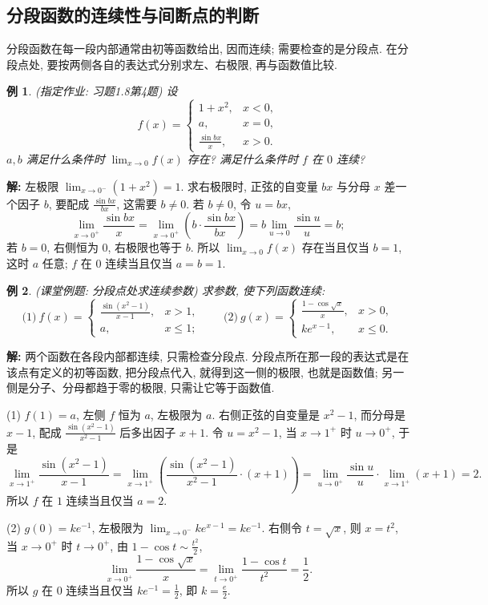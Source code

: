 \documentclass[UTF8,openany]{ctexbook}
\theoremstyle{chinesetextbook}
\newtheorem{example}{例}[section]
\newenvironment{cnsolution}{\par\indent\textbf{解:} \ignorespaces}{\par}
\begin{document}
\subsection{分段函数的连续性与间断点的判断}
分段函数在每一段内部通常由初等函数给出, 因而连续; 需要检查的是分段点. 在分段点处, 要按两侧各自的表达式分别求左、右极限, 再与函数值比较.
\begin{example}
\textnormal{(指定作业: 习题1.8第4题)} 设
\[
f(x)=\begin{cases}1+x^2,&x<0,\\a,&x=0,\\\frac{\sin bx}x,&x>0.\end{cases}
\]
$a,b$ 满足什么条件时 $\displaystyle\lim_{x\to0}f(x)$ 存在? 满足什么条件时 $f$ 在 $0$ 连续?
\end{example}
\begin{cnsolution}
左极限 $\displaystyle\lim_{x\to0^-}(1+x^2)=1$. 求右极限时, 正弦的自变量 $bx$ 与分母 $x$ 差一个因子 $b$, 要配成 $\displaystyle\frac{\sin bx}{bx}$, 这需要 $b\ne0$. 若 $b\ne0$, 令 $u=bx$,
\[
\lim_{x\to0^+}\frac{\sin bx}x=\lim_{x\to0^+}\left(b\cdot\frac{\sin bx}{bx}\right)=b\lim_{u\to0}\frac{\sin u}u=b;
\]
若 $b=0$, 右侧恒为 $0$, 右极限也等于 $b$. 所以 $\displaystyle\lim_{x\to0}f(x)$ 存在当且仅当 $b=1$, 这时 $a$ 任意; $f$ 在 $0$ 连续当且仅当 $a=b=1$.
\end{cnsolution}
\begin{example}
\textnormal{(课堂例题: 分段点处求连续参数)} 求参数, 使下列函数连续:
\[
\text{(1)}\ f(x)=\begin{cases}\frac{\sin(x^2-1)}{x-1},&x>1,\\a,&x\le1;\end{cases}\qquad\text{(2)}\ g(x)=\begin{cases}\frac{1-\cos\sqrt x}x,&x>0,\\ke^{x-1},&x\le0.\end{cases}
\]
\end{example}
\begin{cnsolution}
两个函数在各段内部都连续, 只需检查分段点. 分段点所在那一段的表达式是在该点有定义的初等函数, 把分段点代入, 就得到这一侧的极限, 也就是函数值; 另一侧是分子、分母都趋于零的极限, 只需让它等于函数值.

(1) $f(1)=a$, 左侧 $f$ 恒为 $a$, 左极限为 $a$. 右侧正弦的自变量是 $x^2-1$, 而分母是 $x-1$, 配成 $\displaystyle\frac{\sin(x^2-1)}{x^2-1}$ 后多出因子 $x+1$. 令 $u=x^2-1$, 当 $x\to1^+$ 时 $u\to0^+$, 于是
\[
\lim_{x\to1^+}\frac{\sin(x^2-1)}{x-1}=\lim_{x\to1^+}\left(\frac{\sin(x^2-1)}{x^2-1}\cdot(x+1)\right)=\lim_{u\to0^+}\frac{\sin u}u\cdot\lim_{x\to1^+}(x+1)=2.
\]
所以 $f$ 在 $1$ 连续当且仅当 $a=2$.

(2) $g(0)=ke^{-1}$, 左极限为 $\displaystyle\lim_{x\to0^-}ke^{x-1}=ke^{-1}$. 右侧令 $t=\sqrt x$, 则 $x=t^2$, 当 $x\to0^+$ 时 $t\to0^+$, 由 $\displaystyle1-\cos t\sim\frac{t^2}2$,
\[
\lim_{x\to0^+}\frac{1-\cos\sqrt x}x=\lim_{t\to0^+}\frac{1-\cos t}{t^2}=\frac12.
\]
所以 $g$ 在 $0$ 连续当且仅当 $\displaystyle ke^{-1}=\frac12$, 即 $\displaystyle k=\frac e2$.
\end{cnsolution}
\end{document}
